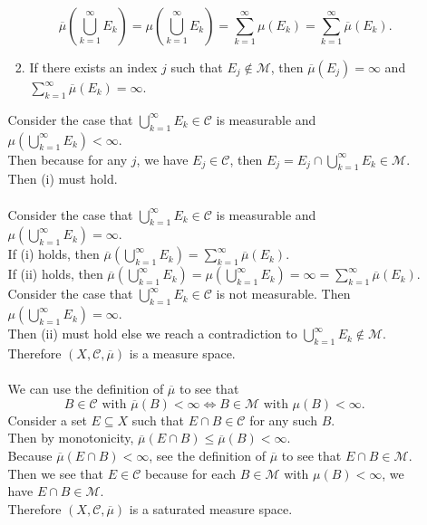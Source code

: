 \begin{enumerate}
\begin{enumerate}[label=(\roman*),align=left]
\begin{enumerate}[label=(\roman*),align=left]
			\[
				\overline\mu(\bigcup_{k=1}^\infty E_k)=\mu(\bigcup_{k=1}^\infty E_k)=\sum_{k=1}^\infty \mu(E_k)=\sum_{k=1}^\infty \overline\mu(E_k).
			\]
			\item If there exists an index $j$ such that $E_j\notin\mathcal{M}$, then $\overline\mu(E_j)=\infty$ and $\sum_{k=1}^\infty \overline\mu(E_k)=\infty$.
		\end{enumerate}
		Consider the case that $\bigcup_{k=1}^\infty E_k\in\mathcal{C}$ is measurable and $\mu(\bigcup_{k=1}^\infty E_k)<\infty$. 
		\\Then because for any $j$, we have $E_j\in\mathcal{C}$, then $E_j=E_j\cap\bigcup_{k=1}^\infty E_k\in\mathcal{M}$.\\
		Then (i) must hold.\\
		\\Consider the case that $\bigcup_{k=1}^\infty E_k\in\mathcal{C}$ is measurable and $\mu(\bigcup_{k=1}^\infty E_k)=\infty$. \\
		If (i) holds, then $\overline\mu(\bigcup_{k=1}^\infty E_k)=\sum_{k=1}^\infty\overline\mu(E_k)$.\\
		If (ii) holds, then $\overline\mu(\bigcup_{k=1}^\infty E_k)=\mu(\bigcup_{k=1}^\infty E_k)=\infty=\sum_{k=1}^\infty \overline\mu(E_k)$.\\\bigskip
		Consider the case that $\bigcup_{k=1}^\infty E_k\in\mathcal{C}$ is not measurable. Then $\mu(\bigcup_{k=1}^\infty E_k)=\infty$. \\
		Then (ii) must hold else we reach a contradiction to $\bigcup_{k=1}^\infty E_k\notin\mathcal{M}$.\\\bigskip
		Therefore $(X,\mathcal{C},\overline\mu)$ is a measure space.\\
		\\We can use the definition of $\overline\mu$ to see that 
		\[
			B\in\mathcal{C}\text{ with }\overline\mu(B)<\infty\iff B\in\mathcal{M}\text{ with }\mu(B)<\infty.
		\]
		Consider a set $E\subseteq X$ such that $E\cap B\in\mathcal{C}$ for any such $B$.
		\\Then by monotonicity, $\overline\mu(E\cap B)\le \overline\mu(B)<\infty$.
		\\Because $\overline\mu(E\cap B)<\infty$, see the definition of $\overline\mu$ to see that $E\cap B\in\mathcal{M}$.
		\\Then we see that $E\in\mathcal{C}$ because for each $B\in\mathcal{M}$ with $\mu(B)<\infty$, we have $E\cap B\in\mathcal{M}$.\\\bigskip
		Therefore $(X,\mathcal{C},\overline\mu)$ is a saturated measure space.

\end{enumerate}
\end{enumerate}
